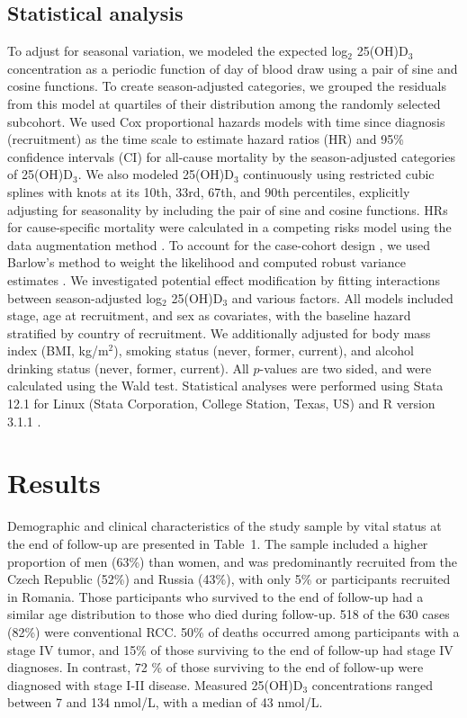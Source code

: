 \documentclass[a4paper,11pt]{article}
\renewcommand{\cite}{\citep}
\begin{document}
\subsection*{Statistical analysis}
To adjust for seasonal variation, we modeled the expected log$_2$ 25(OH)D$_3$ 
concentration as a periodic function of day of blood draw using a pair of sine 
and cosine functions. To create season-adjusted categories, we grouped the 
residuals from this model at quartiles of their distribution among the randomly 
selected subcohort. We used Cox proportional hazards models with time since 
diagnosis (recruitment) as the time scale to estimate hazard ratios (HR) and 
95\% confidence intervals (CI) for all-cause mortality by the season-adjusted 
categories of 25(OH)D$_3$. We also modeled 25(OH)D$_3$ continuously using 
restricted cubic splines with knots at its 10th, 33rd, 67th, and 90th 
percentiles, explicitly adjusting for seasonality by including the pair of sine 
and cosine functions. HRs for cause-specific mortality were calculated in a 
competing risks model using the data augmentation method 
\cite{lunn_applying_1995}. To account for the case-cohort design 
\cite{prentice_case-cohort_1986}, we used Barlow's method to weight the 
likelihood and computed robust variance estimates \cite{barlow_robust_1994, 
barlow_analysis_1999}. We investigated potential effect modification by fitting 
interactions between season-adjusted log$_2$ 25(OH)D$_3$ and various factors. 
All models included stage, age at recruitment, and sex as covariates, with the 
baseline hazard stratified by country of recruitment. We additionally adjusted 
for body mass index (BMI, kg/m$^2$), smoking status (never, former, current), 
and alcohol drinking status (never, former, current).
All $p$-values are two sided, and were calculated using the Wald test. 
Statistical analyses were performed using Stata 12.1 for Linux (Stata 
Corporation, College Station, Texas, US) and R version 3.1.1 \cite{r_2014}.


\section*{Results}
Demographic and clinical characteristics of the study sample by vital status at 
the end of follow-up are presented in Table~1. The sample included a higher 
proportion of men (63\%) than women, and was predominantly recruited from the 
Czech Republic (52\%) and Russia (43\%), with only 5\% or participants 
recruited in Romania. Those participants who survived to the end of follow-up 
had a similar age distribution to those who died during follow-up. 518 
of the 630 cases (82\%) were conventional RCC. 50\% of deaths occurred among 
participants with a stage IV tumor, and 15\% of those surviving to the end of 
follow-up had stage IV diagnoses. In contrast, 72 \% of those surviving to the 
end of follow-up were diagnosed with stage I-II disease. Measured 25(OH)D$_3$ 
concentrations ranged between 7 and 134 nmol/L, with a median of 43 nmol/L.
\end{document}

